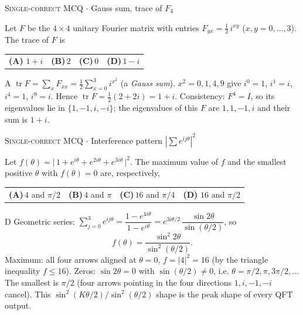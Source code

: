 \documentclass[11pt,a4paper]{article}
\newcommand{\optlabel}[1]{\textbf{(#1)}}
\newcommand{\correctlabel}[1]{\textcolor{okgreen}{\textbf{(#1)}\,\ding{51}}}
\newenvironment{qitem}[1]{\begin{list}{}{\setlength{\leftmargin}{3.3em}\setlength{\labelwidth}{3.1em}%
  \setlength{\labelsep}{0.2em}\setlength{\topsep}{3pt}\setlength{\parsep}{3pt}}\item[\textbf{Q.#1}\hfill]}{\end{list}}
\newcommand{\qsep}{\par\vspace{2pt}{\color{black!15}\hrule}\vspace{4pt}}
\newcommand{\qmeta}[2]{{\footnotesize\color{black!60}\textsc{#1} \;$\cdot$\; #2}\par}
\begin{document}
\begin{qitem}{5}
\qmeta{Single-correct MCQ}{Gauss sum, trace of $F_4$}
Let $F$ be the $4\times4$ unitary Fourier matrix with entries $F_{yx} = \tfrac12\, i^{xy}$ ($x, y = 0, \dots, 3$).
The trace of $F$ is
\par\smallskip\noindent\begin{tabularx}{\linewidth}{@{}*{4}{L}@{}}
\correctlabel{A}\,$1 + i$ & \optlabel{B}\,$2$ & \optlabel{C}\,$0$ & \optlabel{D}\,$1 - i$
\end{tabularx}
\end{qitem}
\begin{solbox}{A}
$\operatorname{tr} F = \sum_x F_{xx} = \tfrac12\sum_{x=0}^{3} i^{x^2}$ (a \emph{Gauss sum}).
$x^2 = 0, 1, 4, 9$ give $i^0 = 1$, $i^1 = i$, $i^4 = 1$, $i^9 = i$. Hence $\operatorname{tr} F = \tfrac12(2 + 2i) = 1 + i$.
Consistency: $F^4 = I$, so its eigenvalues lie in $\{1, -1, i, -i\}$; the eigenvalues of this $F$ are $1, 1, -1, i$ and their
sum is $1 + i$.
\end{solbox}
\qsep

\begin{qitem}{6}
\qmeta{Single-correct MCQ}{Interference pattern $|\sum e^{ij\theta}|^2$}
Let $f(\theta) = \big|\,1 + e^{i\theta} + e^{2i\theta} + e^{3i\theta}\,\big|^2$. The maximum value of $f$ and the smallest
positive $\theta$ with $f(\theta) = 0$ are, respectively,
\par\smallskip\noindent\begin{tabularx}{\linewidth}{@{}*{4}{L}@{}}
\optlabel{A}\,$4$ and $\pi/2$ & \optlabel{B}\,$4$ and $\pi$ & \optlabel{C}\,$16$ and $\pi/4$ & \correctlabel{D}\,$16$ and $\pi/2$
\end{tabularx}
\end{qitem}
\begin{solbox}{D}
Geometric series: $\sum_{j=0}^{3} e^{ij\theta} = \dfrac{1 - e^{4i\theta}}{1 - e^{i\theta}}
= e^{3i\theta/2}\,\dfrac{\sin 2\theta}{\sin(\theta/2)}$, so
\[ f(\theta) = \frac{\sin^2 2\theta}{\sin^2(\theta/2)} . \]
Maximum: all four arrows aligned at $\theta = 0$, $f = |4|^2 = 16$ (by the triangle inequality $f \le 16$).
Zeros: $\sin 2\theta = 0$ with $\sin(\theta/2) \neq 0$, i.e. $\theta = \pi/2, \pi, 3\pi/2, \dots$ The smallest is $\pi/2$
(four arrows pointing in the four directions $1, i, -1, -i$ cancel). This $\sin^2(K\theta/2)/\sin^2(\theta/2)$ shape is the
peak shape of every QFT output.
\end{solbox}
\qsep
\end{document}
